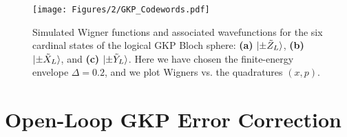 \begin{figure}
    \centering
    \texttt{[image: Figures/2/GKP\_Codewords.pdf]}
    \caption{Simulated Wigner functions and associated wavefunctions for the six cardinal states of the logical GKP Bloch sphere: \textbf{(a)} $\lvert\pm \tilde{Z}_L\rangle$, \textbf{(b)} $\lvert\pm \tilde{X}_L\rangle$, and \textbf{(c)} $\lvert\pm \tilde{Y}_L\rangle$. Here we have chosen the finite-energy envelope $\Delta = 0.2$, and we plot Wigners vs. the quadratures $(x, p)$.}
    \label{fig:2_GKP_Codewords}
\end{figure}
\clearpage

\section{Open-Loop GKP Error Correction \label{sec:2_OpenLoopGKPQEC}}

